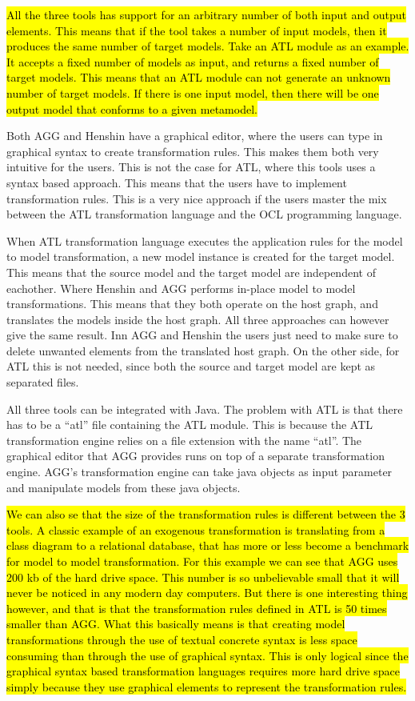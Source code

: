 \documentclass[pdftex,11pt,a4paper]{article}
\begin{document}
\hl{All the three tools has support for an arbitrary number of both input and
output elements. This means that if the tool takes a number of input models, then it
produces the same number of target models. Take an ATL module as an example. It
accepts a fixed number of models as input, and returns a fixed number of target
models. This means that an ATL module can not generate an unknown number of
target models. If there is one input model, then there will be one output model
that conforms to a given metamodel.}

Both AGG and Henshin have a graphical editor, where the users can type in
graphical syntax to create transformation rules. This makes them both very
intuitive for the users. This is not the case for ATL, where this tools uses a
syntax based approach. This means that the users have to implement
transformation rules. This is a very nice approach if the users master the mix
between the ATL transformation language and the OCL programming language.

When ATL transformation language executes the application rules for the model to
model transformation, a new model instance is created for the target model. This
means that the source model and the target model are independent of eachother.
Where Henshin and AGG performs in-place model to model transformations. This
means that they both operate on the host graph, and translates the models inside
the host graph. All three approaches can however give the same result. Inn AGG
and Henshin the users just need to make sure to delete unwanted elements from the
translated host graph. On the other side, for ATL this is not needed, since both
the source and target model are kept as separated files. 

All three tools can be integrated with Java. The problem with ATL is that there
has to be a ``atl'' file containing the ATL module. This is because the ATL
transformation engine relies on a file extension with the name ``atl''. The
graphical editor that AGG provides runs on top of a separate transformation
engine. AGG's transformation engine can take java objects as input parameter and
manipulate models from these java objects.

\hl{We can also se that the size of the transformation rules is different
between the 3 tools. A classic example of an exogenous transformation is translating
from a class diagram to a relational database, that has more or less become a
benchmark for model to model transformation. For this example we can see that
AGG uses 200 kb of the hard drive space. This number is so unbelievable small
that it will never be noticed in any modern day computers. But there is one
interesting thing however, and that is that the transformation rules defined in
ATL is 50 times smaller than AGG. What this basically means is that creating model
transformations through the use of textual concrete syntax is less space
consuming than through the use of graphical syntax. This is only logical since
the graphical syntax based transformation languages requires more hard drive
space simply because they use graphical elements to represent the transformation
rules.}
\end{document}
